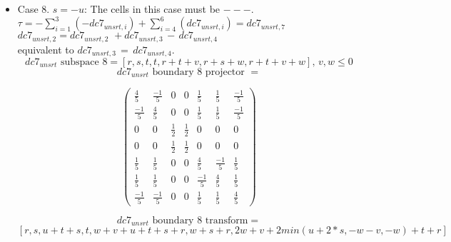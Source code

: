 \documentclass[preprint]{iucr}              %
\begin{document}
{\begin{itemize}
     \item{Case 8. $s=-u$:  The cells in this case must be $---$.\\
    $\tau=-\sum_{i=1}^3(-dc7_{unsrt,i})+\sum_{i=4}^6(dc7_{unsrt,i}) = dc7_{unsrt,7}$\\
     $dc7_{unsrt,2}=dc7_{unsrt,2}\,\,+dc7_{unsrt,3}\,-\,dc7_{unsrt,4}$\\
     equivalent to
     $dc7_{unsrt,3}\,=\,dc7_{unsrt,4}$.
     \[dc7_{unsrt} \text{ subspace 8}=[r,s,t,t,r+t+v,r+s+w,r+t+v+w],\, v, w \leq 0 \]
     \[dc7_{unsrt} \text{ boundary 8 projector } =\]
\begin{center}
\begin{equation*}
\begin{pmatrix}
\frac{4}{5}&\frac{-1}{5}&0&0&\frac{1}{5}&\frac{1}{5}&\frac{-1}{5}\\[.25em]
\frac{-1}{5}&\frac{4}{5}&0&0&\frac{1}{5}&\frac{1}{5}&\frac{-1}{5}\\[.25em]
0&0&\frac{1}{2}&\frac{1}{2}&0&0&0\\[.25em]
0&0&\frac{1}{2}&\frac{1}{2}&0&0&0\\[.25em]
\frac{1}{5}&\frac{1}{5}&0&0&\frac{4}{5}&\frac{-1}{5}&\frac{1}{5}\\[.25em]
\frac{1}{5}&\frac{1}{5}&0&0&\frac{-1}{5}&\frac{4}{5}&\frac{1}{5}\\[.25em]
\frac{-1}{5}&\frac{-1}{5}&0&0&\frac{1}{5}&\frac{1}{5}&\frac{4}{5}
\end{pmatrix}
\end{equation*}
\end{center}


      \[dc7_{unsrt} \text{ boundary 8 transform}=\]
      \[ [r,s,u+t+s,t,w+v+u+t+s+r,w+s+r,2 w+v+2 min(u+2*s,-w-v,-w)+t+r]\]
     }


\end{itemize}}
\end{document}
